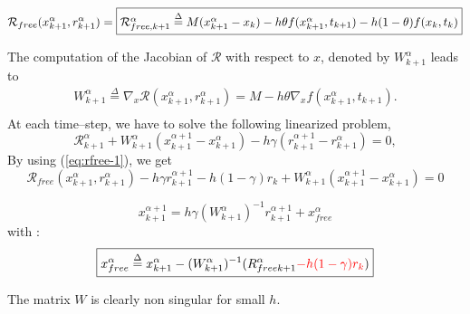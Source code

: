 \[  \mathcal R
_{free}(x^{\alpha}_{k+1},r^{\alpha}_{k+1} )=\fbox{$ \mathcal R _{free, k+1} ^{\alpha} \stackrel{\Delta}{=}  M(x^{\alpha}_{k+1} - x_{k}) -h\theta f( x^{\alpha}_{k+1} , t_{k+1}) - h(1-\theta)f(x_k,t_k)$}\]
 
The computation of the Jacobian of $\mathcal R$ with respect to $x$, denoted by $   W^{\alpha}_{k+1}$ leads to 
\begin{equation}
   \label{eq:NL9}
   \begin{array}{l}
    W^{\alpha}_{k+1} \stackrel{\Delta}{=} \nabla_{x} \mathcal R (x^{\alpha}_{k+1},r^{\alpha}_{k+1})= M - h  \theta \nabla_{x} f(  x^{\alpha}_{k+1}, t_{k+1} ).\\
 \end{array}
\end{equation}
At each time--step, we have to solve the following linearized problem,
\begin{equation}
   \label{eq:NL10}
    \mathcal R^{\alpha}_{k+1} + W^{\alpha}_{k+1} (x^{\alpha+1}_{k+1} -
    x^{\alpha}_{k+1}) - h \gamma (r^{\alpha+1}_{k+1} - r^{\alpha}_{k+1} )  =0 ,
\end{equation}
By using (\ref{eq:rfree-1}), we get
\begin{equation}
  \label{eq:rfree-2}
  \mathcal R
_{free}(x^{\alpha}_{k+1},r^{\alpha}_{k+1} )  - h\gamma r^{\alpha+1}_{k+1} - h(1-\gamma)r_k  + W^{\alpha}_{k+1} (x^{\alpha+1}_{k+1} -
    x^{\alpha}_{k+1})  =0 
\end{equation}

{
  \begin{equation}
    \label{eq:rfree-11}
    \boxed{ x^{\alpha+1}_{k+1} = h\gamma (W^{\alpha}_{k+1})^{-1}r^{\alpha+1}_{k+1} +x^\alpha_{free}}
  \end{equation}
}
with :
\begin{equation}
  \label{eq:rfree-12}
  \boxed{x^\alpha_{free}\stackrel{\Delta}{=}x^{\alpha}_{k+1}-(W^{\alpha}_{k+1})^{-1}\mathcal (R_{freek+1}^{\alpha} \textcolor{red}{- h(1-\gamma) r_k})}
\end{equation}

The matrix $W$ is clearly non singular for small $h$.





